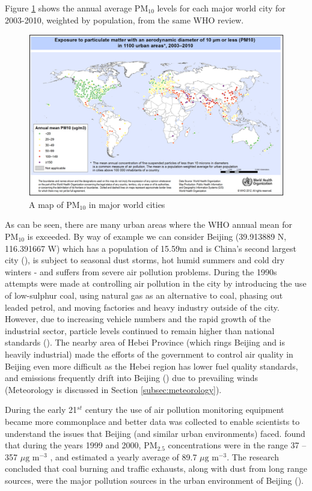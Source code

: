 Figure \ref{fig:mapofpm10} shows the annual average PM$_{10}$ levels for each major world city for 2003-2010, weighted by population, from the same WHO review.

\begin{figure}[H]
\centering
\includegraphics[scale=0.8]{images/who_pm10_world_map}
\caption{A map of PM$_{10}$ in major world cities}
\label{fig:mapofpm10}
\end{figure}

As can be seen, there are many urban areas where the WHO annual mean for PM$_{10}$ is exceeded. By way of example we can consider Beijing (39.913889 N, 116.391667 W) which has a population of 15.59m and is China's second largest city (\cite{TheUnitedNationsStatisticsDivision2013}), is subject to seasonal dust storms, hot humid summers and cold dry winters - and suffers from severe air pollution problems. During the 1990s attempts were made at controlling air pollution in the city by introducing the use of low-sulphur coal, using natural gas as an alternative to coal, phasing out leaded petrol, and moving factories and heavy industry outside of the city. However, due to increasing vehicle numbers and the rapid growth of the industrial sector, particle levels continued to remain higher than national standards (\cite{Sun2004}). The nearby area of Hebei Province (which rings Beijing and is heavily industrial) made the efforts of the government to control air quality in Beijing even more difficult as the Hebei region has lower fuel quality standards, and emissions frequently drift into Beijing (\cite{Tuo2013}) due to prevailing winds (Meteorology is discussed in Section \ref{subsec:meteorology}).

During the early 21$^{st}$ century the use of air pollution monitoring equipment became more commonplace and better data was collected to enable scientists to understand the issues that Beijing (and similar urban environments) faced. \cite{Sun2004} found that during the years 1999 and 2000, PM$_{2.5}$ concentrations were in the range 37 -- 357 $\mu \text{g m}^{-3}$ , and estimated a yearly average of 89.7 $\mu \text{g m}^{-3}$.  The research concluded that coal burning and traffic exhausts, along with dust from long range sources, were the major pollution sources in the urban environment of Beijing (\cite{Sun2004}).

